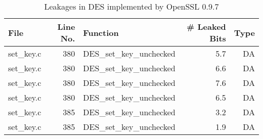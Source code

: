 \begin{table}[h!]
\centering\tiny\scriptsize
\caption{Leakages in DES implemented by OpenSSL 0.9.7}\label{tab:DESOpenSSL0.9.7}
\begin{tabular}{lrlrr}
\hline
\textbf{File} & \textbf{Line No.} & \textbf{Function} & \textbf{\# Leaked Bits} & \textbf{Type} \\\hline
set\_key.c& 380&DES\_set\_key\_unchecked&5.7 &DA\\
set\_key.c& 380&DES\_set\_key\_unchecked&6.6 &DA\\
set\_key.c& 380&DES\_set\_key\_unchecked&7.6 &DA\\
set\_key.c& 380&DES\_set\_key\_unchecked&6.5 &DA\\
set\_key.c& 385&DES\_set\_key\_unchecked&3.2 &DA\\
set\_key.c& 385&DES\_set\_key\_unchecked&1.9 &DA\\
\hline
\end{tabular}
\renewcommand{\baselinestretch}{1.0}\selectfont
\end{table}
